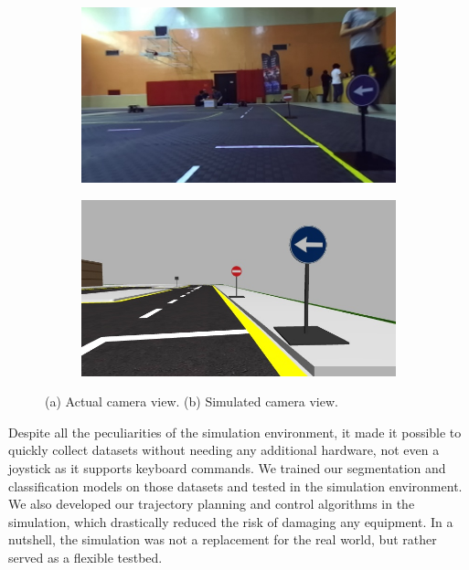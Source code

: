 \begin{figure}[h]
  \centering
  \begin{subfigure}[b]{0.47\linewidth}
    \includegraphics[width=\linewidth]{figures/actual-camera-view.jpg}
    \caption{}
  \end{subfigure}
  \begin{subfigure}[b]{0.47\linewidth}
    \includegraphics[width=\linewidth]{figures/simulated-camera-view.jpg}
    \caption{}
  \end{subfigure}
  \caption[Comparison of actual and simulated camera views]{(a) Actual camera
    view. (b) Simulated camera view.}
  \label{figure:camera-view}
\end{figure}

Despite all the peculiarities of the simulation environment, it made it
possible to quickly collect datasets without needing any additional hardware,
not even a joystick as it supports keyboard commands. We trained our
segmentation and classification models on those datasets and tested in the
simulation environment. We also developed our trajectory planning and control
algorithms in the simulation, which drastically reduced the risk of damaging
any equipment. In a nutshell, the simulation was not a replacement for the real
world, but rather served as a flexible testbed.
